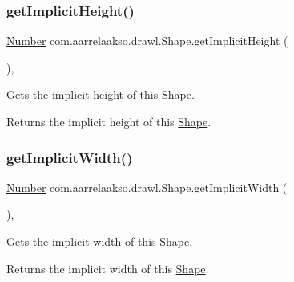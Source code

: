 \subsubsection{\texorpdfstring{get\+Implicit\+Height()}{getImplicitHeight()}}
{\footnotesize\ttfamily \hyperlink{interfacecom_1_1aarrelaakso_1_1drawl_1_1_number}{Number} com.\+aarrelaakso.\+drawl.\+Shape.\+get\+Implicit\+Height (\begin{DoxyParamCaption}{ }\end{DoxyParamCaption})\hspace{0.3cm}{\ttfamily [protected]}, {\ttfamily [inherited]}}



Gets the implicit height of this \hyperlink{classcom_1_1aarrelaakso_1_1drawl_1_1_shape}{Shape}. 

\begin{DoxyReturn}{Returns}
the implicit height of this \hyperlink{classcom_1_1aarrelaakso_1_1drawl_1_1_shape}{Shape}. 
\end{DoxyReturn}
\mbox{\label{classcom_1_1aarrelaakso_1_1drawl_1_1_shape_af8182545b3b1c85ecaee849474f63c6b}} 
\subsubsection{\texorpdfstring{get\+Implicit\+Width()}{getImplicitWidth()}}
{\footnotesize\ttfamily \hyperlink{interfacecom_1_1aarrelaakso_1_1drawl_1_1_number}{Number} com.\+aarrelaakso.\+drawl.\+Shape.\+get\+Implicit\+Width (\begin{DoxyParamCaption}{ }\end{DoxyParamCaption})\hspace{0.3cm}{\ttfamily [protected]}, {\ttfamily [inherited]}}



Gets the implicit width of this \hyperlink{classcom_1_1aarrelaakso_1_1drawl_1_1_shape}{Shape}. 

\begin{DoxyReturn}{Returns}
the implicit width of this \hyperlink{classcom_1_1aarrelaakso_1_1drawl_1_1_shape}{Shape}. 
\end{DoxyReturn}
\mbox{\label{classcom_1_1aarrelaakso_1_1drawl_1_1_shape_a0903079fd35e3cfdd6cdc299548a9680}} 
